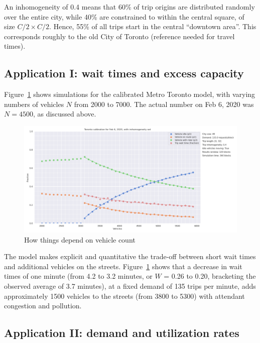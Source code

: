 \documentclass[
  letterpaper,
]{article}
\begin{document}
An inhomogeneity of 0.4 means that 60\% of trip origins are distributed
randomly over the entire city, while 40\% are constrained to within the
central square, of size \(C/2 \times C/2\). Hence, 55\% of all trips
start in the central ``downtown area''. This corresponds roughly to the
old City of Toronto (reference needed for travel times).

\hypertarget{application-i-wait-times-and-excess-capacity}{%
\subsection{Application I: wait times and excess
capacity}\label{application-i-wait-times-and-excess-capacity}}

Figure~\ref{fig-toronto-final} shows simulations for the calibrated
Metro Toronto model, with varying numbers of vehicles \(N\) from 2000 to
7000. The actual number on Feb 6, 2020 was \(N=4500\), as discussed
above.

\begin{figure}

{\centering \includegraphics{toronto_vehicle_count.png}

}

\caption{\label{fig-toronto-final}How things depend on vehicle count}

\end{figure}

The model makes explicit and quantitative the trade-off between short
wait times and additional vehicles on the streets.
Figure~\ref{fig-toronto-final} shows that a decrease in wait times of
one minute (from 4.2 to 3.2 minutes, or \(W\) = 0.26 to 0.20, bracketing
the observed average of 3.7 minutes), at a fixed demand of 135 trips per
minute, adds approximately 1500 vehicles to the streets (from 3800 to
5300) with attendant congestion and pollution.

\hypertarget{application-ii-demand-and-utilization-rates}{%
\subsection{Application II: demand and utilization
rates}\label{application-ii-demand-and-utilization-rates}}
\end{document}
